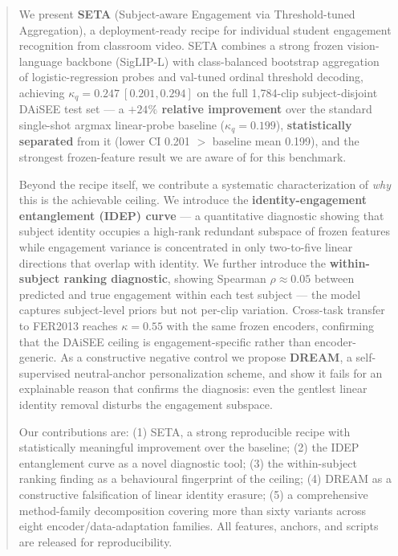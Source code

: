 \begin{abstract}
We present \textbf{SETA} (Subject-aware Engagement via Threshold-tuned
Aggregation), a deployment-ready recipe for individual student
engagement recognition from classroom video. SETA combines a strong
frozen vision-language backbone (SigLIP-L) with class-balanced
bootstrap aggregation of logistic-regression probes and val-tuned
ordinal threshold decoding, achieving \textbf{$\kappa_q = 0.247~[0.201,
0.294]$} on the full 1{,}784-clip subject-disjoint DAiSEE test
set --- a \textbf{$+24\%$ relative improvement} over the standard
single-shot argmax linear-probe baseline ($\kappa_q = 0.199$),
\textbf{statistically separated} from it (lower CI 0.201 $>$ baseline
mean 0.199), and the strongest frozen-feature result we are aware of
for this benchmark.

Beyond the recipe itself, we contribute a systematic characterization
of \emph{why} this is the achievable ceiling. We introduce the
\textbf{identity-engagement entanglement (IDEP) curve} --- a
quantitative diagnostic showing that subject identity occupies a
high-rank redundant subspace of frozen features while engagement
variance is concentrated in only two-to-five linear directions that
overlap with identity. We further introduce the \textbf{within-subject
ranking diagnostic}, showing Spearman $\rho \approx 0.05$ between
predicted and true engagement within each test subject --- the model
captures subject-level priors but not per-clip variation. Cross-task
transfer to FER2013 reaches $\kappa = 0.55$ with the same frozen
encoders, confirming that the DAiSEE ceiling is engagement-specific
rather than encoder-generic. As a constructive negative control we
propose \textbf{DREAM}, a self-supervised neutral-anchor
personalization scheme, and show it fails for an explainable reason
that confirms the diagnosis: even the gentlest linear identity
removal disturbs the engagement subspace.

Our contributions are: (1) SETA, a strong reproducible recipe with
statistically meaningful improvement over the baseline;
(2) the IDEP entanglement curve as a novel diagnostic tool;
(3) the within-subject ranking finding as a behavioural fingerprint
of the ceiling; (4) DREAM as a constructive falsification of linear
identity erasure; (5) a comprehensive method-family decomposition
covering more than sixty variants across eight encoder/data-adaptation
families. All features, anchors, and scripts are released for
reproducibility.
\end{abstract}
